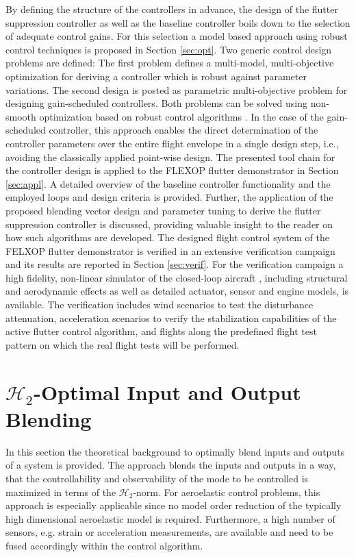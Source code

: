 \documentclass[aerospace,article,submit,moreauthors,pdftex,10pt,a4paper]{Definitions/mdpi}
\begin{document}
By defining the structure of the controllers in advance, the design of the flutter suppression controller as well as the baseline controller boils down to the  selection of adequate control gains. For this selection a model based approach using robust control techniques is proposed in Section \ref{sec:opt}. Two generic control design problems are defined:  The first problem defines a multi-model, multi-objective optimization for deriving a controller which is robust against parameter variations. The second design is posted as parametric multi-objective problem for designing gain-scheduled controllers. Both problems can be solved using non-smooth optimization based on robust control algorithms \cite{Apkarian06}.  In the case of the gain-scheduled controller, this approach enables the direct determination of the controller parameters over the entire flight envelope in a single design step, i.e., avoiding the classically applied point-wise design. 
The presented tool chain for the controller design is applied to the FLEXOP flutter demonstrator in Section \ref{sec:appl}.
A detailed overview of the baseline controller functionality and the employed loops and design criteria is provided. Further, the application of the proposed blending vector design and parameter tuning to derive the flutter suppression controller is discussed, providing valuable insight to the reader on how such algorithms are developed.
The designed flight control system of the FELXOP flutter demonstrator is verified in an extensive verification campaign and its results are reported in Section \ref{sec:verif}. For the verification campaign a high fidelity, non-linear simulator of the closed-loop aircraft \cite{Wuestenhagen18,Meddaikar19}, including structural and aerodynamic  effects as well as detailed actuator, sensor and engine models, is available.
The verification includes wind scenarios to test the disturbance attenuation, acceleration scenarios to verify the stabilization capabilities of the active flutter control algorithm, and  flights along the predefined flight test pattern on which the real flight tests will be performed.

\section{$\mathcal{H}_{2}$-Optimal Input and Output Blending}\label{sec:blend}
In this section the theoretical background to optimally blend  inputs and outputs of a system is provided. The approach blends the inputs and outputs in a way, that the controllability and observability of the mode to be controlled is maximized in terms of the $\mathcal{H}_{2}$-norm. 
For aeroelastic control problems, this approach is especially applicable since no model order reduction of the typically high dimensional aeroelastic model is required. Furthermore, a high number of sensors, e.g. strain or acceleration measurements, are available and need to be fused accordingly within the control algorithm. 
\end{document}

